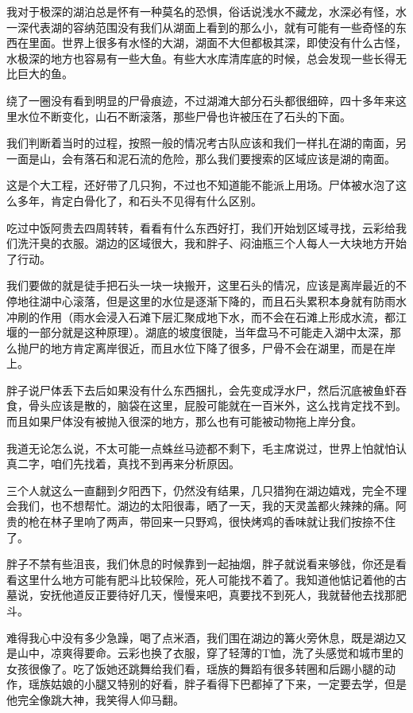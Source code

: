 我对于极深的湖泊总是怀有一种莫名的恐惧，俗话说浅水不藏龙，水深必有怪，水一深代表湖的容纳范围没有我们从湖面上看到的那么小，就有可能有一些奇怪的东西在里面。世界上很多有水怪的大湖，湖面不大但都极其深，即使没有什么古怪，水极深的地方也容易有一些大鱼。有些大水库清库底的时候，总会发现一些长得无比巨大的鱼。

绕了一圈没有看到明显的尸骨痕迹，不过湖滩大部分石头都很细碎，四十多年来这里水位不断变化，山石不断滚落，那些尸骨也许被压在了石头的下面。

我们判断着当时的过程，按照一般的情况考古队应该和我们一样扎在湖的南面，另一面是山，会有落石和泥石流的危险，那么我们要搜索的区域应该是湖的南面。

这是个大工程，还好带了几只狗，不过也不知道能不能派上用场。尸体被水泡了这么多年，肯定白骨化了，和石头不见得有什么区别。

吃过中饭阿贵去四周转转，看看有什么东西好打，我们开始划区域寻找，云彩给我们洗汗臭的衣服。湖边的区域很大，我和胖子、闷油瓶三个人每人一大块地方开始了行动。

我们要做的就是徒手把石头一块一块搬开，这里石头的情况，应该是离岸最近的不停地往湖中心滚落，但是这里的水位是逐渐下降的，而且石头累积本身就有防雨水冲刷的作用（雨水会浸入石滩下层汇聚成地下水，而不会在石滩上形成水流，都江堰的一部分就是这种原理）。湖底的坡度很陡，当年盘马不可能走入湖中太深，那么抛尸的地方肯定离岸很近，而且水位下降了很多，尸骨不会在湖里，而是在岸上。

胖子说尸体丢下去后如果没有什么东西捆扎，会先变成浮水尸，然后沉底被鱼虾吞食，骨头应该是散的，脑袋在这里，屁股可能就在一百米外，这么找肯定找不到。而且如果尸体没有被抛入很深的地方，那么也有可能被动物拖上岸分食。

我道无论怎么说，不太可能一点蛛丝马迹都不剩下，毛主席说过，世界上怕就怕认真二字，咱们先找着，真找不到再来分析原因。

三个人就这么一直翻到夕阳西下，仍然没有结果，几只猎狗在湖边嬉戏，完全不理会我们，也不想帮忙。湖边的太阳很毒，晒了一天，我的天灵盖都火辣辣的痛。阿贵的枪在林子里响了两声，带回来一只野鸡，很快烤鸡的香味就让我们按捺不住了。

胖子不禁有些沮丧，我们休息的时候靠到一起抽烟，胖子就说看来够戗，你还是看看这里什么地方可能有肥斗比较保险，死人可能找不着了。我知道他惦记着他的古墓说，安抚他道反正要待好几天，慢慢来吧，真要找不到死人，我就替他去找那肥斗。

难得我心中没有多少急躁，喝了点米酒，我们围在湖边的篝火旁休息，既是湖边又是山中，凉爽得要命。云彩也换了衣服，穿了轻薄的T恤，洗了头感觉和城市里的女孩很像了。吃了饭她还跳舞给我们看，瑶族的舞蹈有很多转圈和后踢小腿的动作，瑶族姑娘的小腿又特别的好看，胖子看得下巴都掉了下来，一定要去学，但是他完全像跳大神，我笑得人仰马翻。

